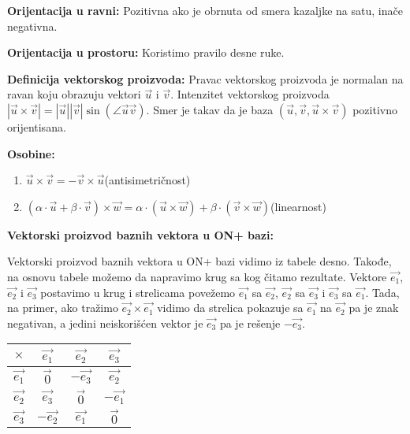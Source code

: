 \documentclass[12pt]{article}
\newcommand{\vek}[1]{\overrightarrow{#1}}
\begin{document}
\textbf{Orijentacija u ravni:} Pozitivna ako je obrnuta od smera kazaljke na
satu, inače negativna.
\par

\textbf{Orijentacija u prostoru:} Koristimo pravilo desne ruke.
\par

\textbf{Definicija vektorskog proizvoda:} Pravac vektorskog proizvoda je
normalan na ravan koju obrazuju vektori $\vek{u}$ i $\vek{v}$. Intenzitet
vektorskog proizvoda $|\vek{u}\times\vek{v}|=|\vek{u}||\vek{v}|
    \sin(\angle{\vek{u}\vek{v}})$. Smer je takav da je baza
$(\vek{u},\vek{v},\vek{u}\times\vek{v})$ pozitivno orijentisana.
\par

\textbf{Osobine:}
\begin{enumerate}[label=\textbf{(\arabic*)}]
    \item $\vek{u}\times\vek{v}=-\vek{v}\times\vek{u}$\hspace*{1cm}(antisimetričnost)
    \item $(\alpha\cdot\vek{u}+\beta\cdot\vek{v})\times\vek{w}=\alpha\cdot(\vek{u}\times\vek{w})+\beta\cdot(\vek{v}\times\vek{w})$\hspace*{1cm}(linearnost)
\end{enumerate}
\par

\textbf{Vektorski proizvod baznih vektora u ON+ bazi:}\\[0.1cm]
\noindent
\begin{minipage}{0.65\textwidth}
    \begin{flushleft}
        Vektorski proizvod baznih vektora u ON+ bazi vidimo iz tabele desno.
        Takođe, na osnovu tabele možemo da napravimo krug sa kog čitamo
        rezultate. Vektore $\vek{e_1}$, $\vek{e_2}$ i $\vek{e_3}$ postavimo u
        krug i strelicama povežemo $\vek{e_1}$ sa $\vek{e_2}$, $\vek{e_2}$ sa
        $\vek{e_3}$ i $\vek{e_3}$ sa $\vek{e_1}$. Tada, na primer, ako tražimo
        $\vek{e_2}\times\vek{e_1}$ vidimo da strelica pokazuje sa $\vek{e_1}$
        na $\vek{e_2}$ pa je znak negativan, a jedini neiskorišćen vektor je
        $\vek{e_3}$ pa je rešenje $-\vek{e_3}$.
    \end{flushleft}
\end{minipage}
\hfill
\begin{minipage}{0.3\textwidth}
    \centering
    \begin{tabular}{|c|c|c|c|}
        \hline
        $\times$    & $\vek{e_1}$  & $\vek{e_2}$  & $\vek{e_3}$  \\
        \hline
        $\vek{e_1}$ & $\vek{0}$    & $-\vek{e_3}$ & $\vek{e_2}$  \\
        \hline
        $\vek{e_2}$ & $\vek{e_3}$  & $\vek{0}$    & $-\vek{e_1}$ \\
        \hline
        $\vek{e_3}$ & $-\vek{e_2}$ & $\vek{e_1}$  & $\vek{0}$    \\
        \hline
    \end{tabular}
\end{minipage}
\par
\end{document}
